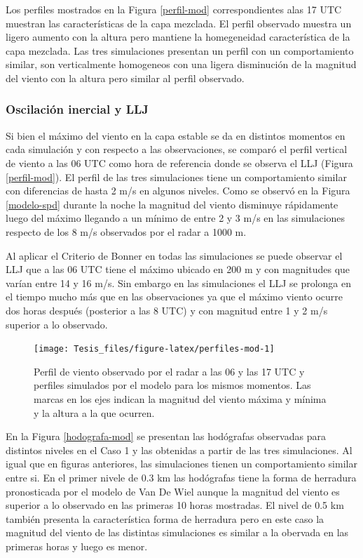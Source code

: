 \documentclass[12pt,spanish,oneside, a4paper]{book}
\begin{document}
Los perfiles mostrados en la Figura \ref{perfil-mod} correspondientes
alas 17 UTC muestran las características de la capa mezclada. El perfil
observado muestra un ligero aumento con la altura pero mantiene la
homegeneidad característica de la capa mezclada. Las tres simulaciones
presentan un perfil con un comportamiento similar, son verticalmente
homogeneos con una ligera disminución de la magnitud del viento con la
altura pero similar al perfil observado.

\subsubsection{Oscilación inercial y
LLJ}\label{oscilacion-inercial-y-llj-1}

Si bien el máximo del viento en la capa estable se da en distintos
momentos en cada simulación y con respecto a las observaciones, se
comparó el perfil vertical de viento a las 06 UTC como hora de
referencia donde se observa el LLJ (Figura \ref{perfil-mod}). El perfil
de las tres simulaciones tiene un comportamiento similar con diferencias
de hasta 2 m/s en algunos niveles. Como se observó en la Figura
\ref{modelo-spd} durante la noche la magnitud del viento disminuye
rápidamente luego del máximo llegando a un mínimo de entre 2 y 3 m/s en
las simulaciones respecto de los 8 m/s observados por el radar a 1000 m.

Al aplicar el Criterio de Bonner en todas las simulaciones se puede
observar el LLJ que a las 06 UTC tiene el máximo ubicado en 200 m y con
magnitudes que varían entre 14 y 16 m/s. Sin embargo en las simulaciones
el LLJ se prolonga en el tiempo mucho más que en las observaciones ya
que el máximo viento ocurre dos horas después (posterior a las 8 UTC) y
con magnitud entre 1 y 2 m/s superior a lo observado.

\begin{figure}

{\centering \texttt{[image: Tesis\_files/figure-latex/perfiles-mod-1]} 

}

\caption{Perfil de viento observado por el radar a las 06 y las 17 UTC y perfiles simulados por el modelo para los mismos momentos. Las marcas en los ejes indican la magnitud del viento máxima y mínima y la altura a la que ocurren. \label{perfil-mod}}\label{fig:perfiles-mod}
\end{figure}

En la Figura \ref{hodografa-mod} se presentan las hodógrafas observadas
para distintos niveles en el Caso 1 y las obtenidas a partir de las tres
simulaciones. Al igual que en figuras anteriores, las simulaciones
tienen un comportamiento similar entre si. En el primer nivele de 0.3 km
las hodógrafas tiene la forma de herradura pronosticada por el modelo de
Van De Wiel aunque la magnitud del viento es superior a lo observado en
las primeras 10 horas mostradas. El nivel de 0.5 km también presenta la
característica forma de herradura pero en este caso la magnitud del
viento de las distintas simulaciones es similar a la obervada en las
primeras horas y luego es menor.
\end{document}
